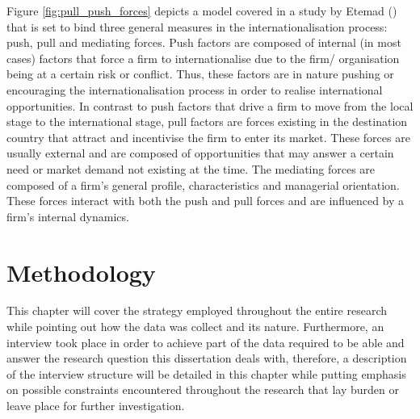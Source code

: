 \documentclass[11pt,a4paper]{article}
\begin{document}
{Figure \ref{fig:pull_push_forces} depicts a model covered in a study by Etemad (\citeyear{etemadInternationalizationSmallMediumsized2004}) that is set to bind three general measures in the internationalisation process: push, pull and mediating forces. Push factors are composed of internal (in most cases) factors that force a firm to internationalise due to the firm/ organisation being at a certain risk or conflict. Thus, these factors are in nature pushing or encouraging the internationalisation process in order to realise international opportunities. In contrast to push factors that drive a firm to move from the local stage to the international stage, pull factors are forces existing in the destination country that attract and incentivise the firm to enter its market. These forces are usually external and are composed of opportunities that may answer a certain need or market demand not existing at the time. The mediating forces are composed of a firm's general profile, characteristics and managerial orientation. These forces interact with both the push and pull forces and are influenced by a firm's internal dynamics.



\section{Methodology}
This chapter will cover the strategy employed throughout the entire research while pointing out how the data was collect and its nature. Furthermore, an interview took place in order to achieve part of the data required to be able and answer the research question this dissertation deals with, therefore, a description of the interview structure will be detailed in this chapter while putting emphasis on possible constraints encountered throughout the research that lay burden or leave place for further investigation. 

}
\end{document}

